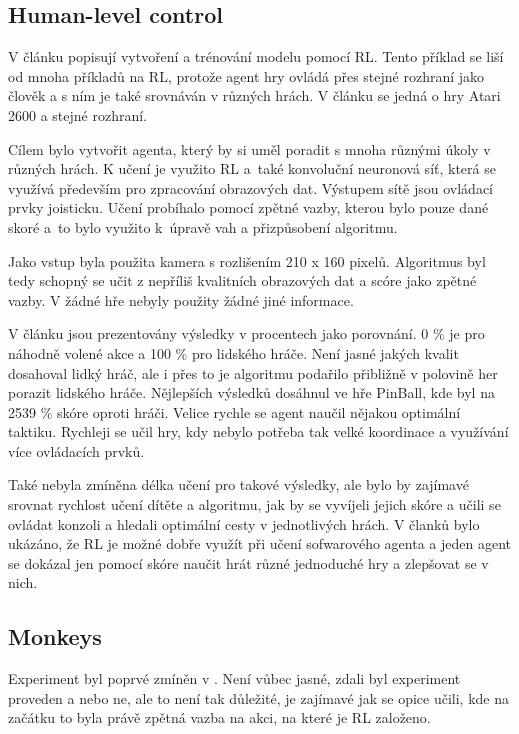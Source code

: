 \documentclass{article}
\begin{document}
\subsection{Human-level control}
V článku \cite{mnih2015human} popisují vytvoření a trénování modelu pomocí RL. Tento příklad se liší od mnoha příkladů na RL, protože agent hry ovládá přes stejné rozhraní jako člověk a s ním je také srovnáván v různých hrách. V článku se jedná o hry Atari 2600 a stejné rozhraní.

Cílem bylo vytvořit agenta, který by si uměl poradit s mnoha různými úkoly v různých hrách. K učení je využito RL a~také konvoluční neuronová síť, která se využívá především pro zpracování obrazových dat. Výstupem sítě jsou ovládací prvky joisticku. Učení probíhalo pomocí zpětné vazby, kterou bylo pouze dané skoré a~to bylo využito k~úpravě vah a přizpůsobení algoritmu. 

Jako vstup byla použita kamera s rozlišením 210 x 160 pixelů. Algoritmus byl tedy schopný se učit z nepříliš kvalitních obrazových dat a scóre jako zpětné vazby. V žádné hře nebyly použity žádné jiné informace. 

V článku jsou prezentovány výsledky v procentech jako porovnání. 0 \% je pro náhodně volené akce a 100 \% pro lidského hráče. Není jasné jakých kvalit dosahoval lidký hráč, ale i přes to je algoritmu podařilo přibližně v polovině her porazit lidského hráče. Nějlepších výsledků dosáhnul ve hře PinBall, kde byl na 2539 \% skóre oproti hráči. Velice rychle se agent naučil nějakou optimální taktiku. Rychleji se učil hry, kdy nebylo potřeba tak velké koordinace a využívání více ovládacích prvků. 

Také nebyla zmíněna délka učení pro takové výsledky, ale bylo by zajímavé srovnat rychlost učení dítěte a algoritmu, jak by se vyvíjeli jejich skóre a učili se ovládat konzoli a hledali optimální cesty v jednotlivých hrách. V članků bylo ukázáno, že RL je možné dobře využít při učení sofwarového agenta a jeden agent se dokázal jen pomocí skóre naučit hrát různé jednoduché hry a zlepšovat se v nich. 

\subsection{Monkeys}
\label{monkey}
Experiment byl poprvé zmíněn v \cite{hamel1996competing}. Není vůbec jasné, zdali byl experiment proveden a nebo ne, ale to není tak důležité, je zajímavé jak se opice učili, kde na začátku to byla právě zpětná vazba na akci, na které je RL založeno.
\end{document}
